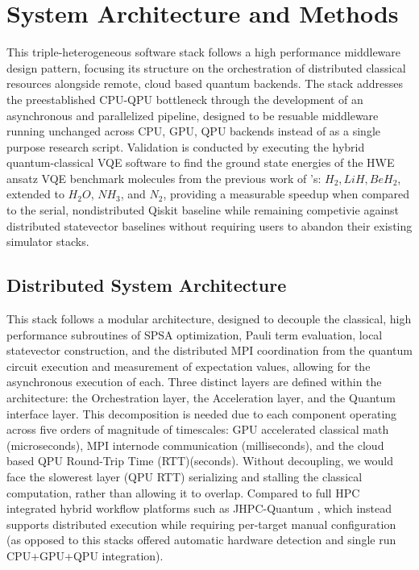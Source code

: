\section{System Architecture and Methods}
\label{sec:System Architecture and Methods}
This triple-heterogeneous software stack follows a high performance middleware design pattern,
focusing its structure on the orchestration of distributed classical resources alongside remote, cloud based quantum backends. The stack 
addresses the preestablished CPU-QPU bottleneck \parencite{cruise2020practicalquantumcomputingvalue} through the development of an asynchronous and 
parallelized pipeline, designed to be resuable middleware running unchanged across CPU, GPU, QPU backends 
instead of as a single purpose research script. Validation is conducted by executing the 
hybrid quantum-classical VQE software to find the ground state energies of the HWE ansatz VQE benchmark molecules from the previous work of 
\textcite{kandala2017hardware}'s: $H_2, LiH, BeH_{2}$, extended to $H_{2}O$, $NH_{3}$, and $N_{2}$, providing a    
measurable speedup when compared to the serial, nondistributed Qiskit baseline while remaining competivie against distributed statevector 
baselines without requiring users to abandon their existing simulator stacks. 

\subsection{Distributed System Architecture}
This stack follows a modular architecture, designed to decouple the classical, high performance subroutines of SPSA optimization, Pauli term evaluation, local statevector
construction, and the distributed MPI coordination from the quantum circuit execution and measurement of expectation values, allowing for the asynchronous execution of each. 
Three distinct layers are defined within the architecture: the Orchestration layer, the Acceleration layer, and the Quantum interface layer. 
This decomposition is needed due to each component operating across five orders of magnitude of timescales:
GPU accelerated classical math (microseconds), MPI internode communication (milliseconds), and the cloud based 
QPU Round-Trip Time (RTT)(seconds). Without decoupling, we would face the slowerest layer (QPU RTT) serializing and stalling the 
classical computation, rather than allowing it to overlap. Compared to full HPC integrated hybrid workflow platforms such as JHPC-Quantum \parencite{shehata2026openqse},
which instead supports distributed execution while requiring per-target manual configuration (as opposed to this stacks offered automatic 
hardware detection and single run CPU+GPU+QPU integration). 

